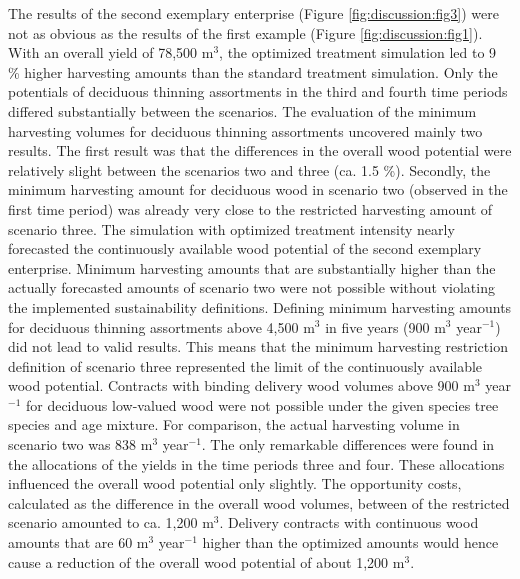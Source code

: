 The results of the second exemplary enterprise (Figure \ref{fig:discussion:fig3}) were not as obvious as the results of the first example (Figure \ref{fig:discussion:fig1}). With an overall yield of 78,500 m$^3$, the optimized treatment simulation led to 9 \% higher harvesting amounts than the standard treatment simulation. Only the potentials of deciduous thinning assortments in the third and fourth time periods differed substantially between the scenarios. The evaluation of the minimum harvesting volumes for deciduous thinning assortments uncovered mainly two results. The first result was that the differences in the overall wood potential were relatively slight between the scenarios two and three (ca. 1.5 \%). Secondly, the minimum harvesting amount for deciduous wood in scenario two (observed in the first time period) was already very close to the restricted harvesting amount of scenario three. The simulation with optimized treatment intensity nearly forecasted the continuously available wood potential of the second exemplary enterprise. Minimum harvesting amounts that are substantially higher than the actually forecasted amounts of scenario two were not possible without violating the implemented sustainability definitions. Defining minimum harvesting amounts for deciduous thinning assortments above 4,500 m$^3$ in five years (900 m$^3$ year$^{-1}$) did not lead to valid results. This means that the minimum harvesting restriction definition of scenario three represented the limit of the continuously available wood potential. Contracts with binding delivery wood volumes above 900 m$^3$ year$^{-1}$ for deciduous low-valued wood were not possible under the given species tree species and age mixture. For comparison, the actual harvesting volume in scenario two was 838 m$^3$ year$^{-1}$. The only remarkable differences were found in the allocations of the yields in the time periods three and four. These allocations influenced the overall wood potential only slightly. The opportunity costs, calculated as the difference in the overall wood volumes, between of the restricted scenario amounted to ca. 1,200 m$^3$. Delivery contracts with continuous wood amounts that are 60 m$^3$ year$^{-1}$ higher than the optimized amounts would hence cause a reduction of the overall wood potential of about 1,200 m$^3$.

